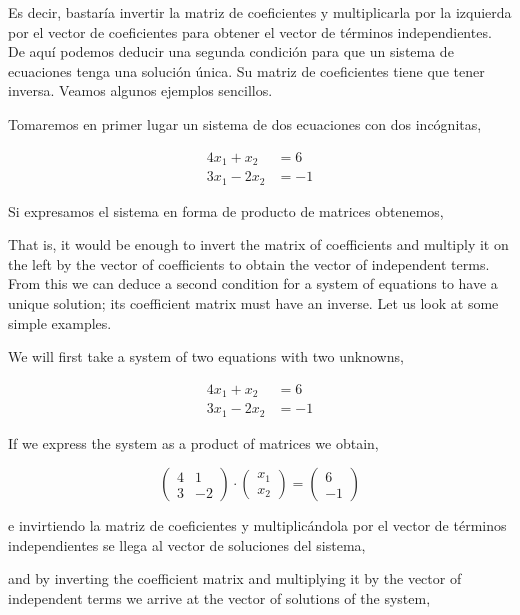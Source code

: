 \begin{paracol}{2}
Es decir, bastaría invertir la matriz de coeficientes y multiplicarla por la izquierda por el vector de coeficientes para obtener el vector de  términos independientes. De aquí podemos deducir una segunda condición para que un sistema de ecuaciones tenga una solución única.    Su matriz de coeficientes tiene que tener inversa. Veamos algunos ejemplos sencillos.

Tomaremos en primer lugar un sistema de dos ecuaciones con dos incógnitas,

\begin{align*}
4x_1+x_2&=6\\
3x_1-2x_2&=-1
\end{align*}

Si expresamos el sistema en forma de producto de matrices obtenemos,

\switchcolumn

That is, it would be enough to invert the matrix of coefficients and multiply it on the left by the vector of coefficients to obtain the vector of independent terms. From this we can deduce a second condition for a system of equations to have a unique solution; its coefficient matrix must have an inverse. Let us look at some simple examples.

We will first take a system of two equations with two unknowns,

\begin{align*}
4x_1+x_2&=6 \\
3x_1-2x_2&=-1
\end{align*}

If we express the system as a product of matrices we obtain,

\end{paracol}

\begin{equation*}
\begin{pmatrix}
4& 1\\
3& -2
\end{pmatrix} \cdot \begin{pmatrix}
x_1\\
x_2
\end{pmatrix}=\begin{pmatrix}
6\\
-1
\end{pmatrix}
\end{equation*}

\begin{paracol}{2}
e invirtiendo la matriz de coeficientes y multiplicándola por el vector de términos independientes se llega al vector de soluciones del sistema,

\switchcolumn
and by inverting the coefficient matrix and multiplying it by the vector of independent terms we arrive at the vector of solutions of the system,

\end{paracol}

